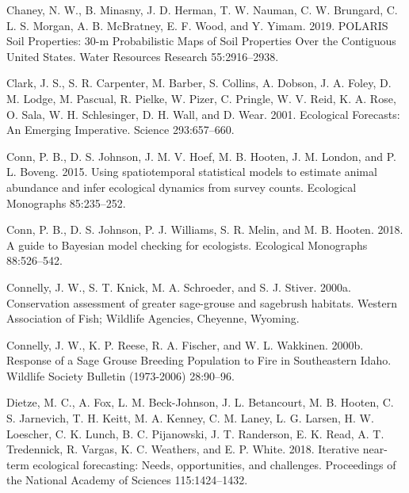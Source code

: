 \documentclass[
  12pt,
]{article}
\newlength{\cslhangindent}
\newenvironment{CSLReferences}[2] %
 {%
  \setlength{\parindent}{0pt}
  \ifodd #1 \everypar{\setlength{\hangindent}{\cslhangindent}}\ignorespaces\fi
  \ifnum #2 > 0
  \setlength{\parskip}{#2\baselineskip}
  \fi
 }%
 {}
\begin{document}
\begin{CSLReferences}{1}{0}
\leavevmode{}%
Chaney, N. W., B. Minasny, J. D. Herman, T. W. Nauman, C. W. Brungard, C. L. S. Morgan, A. B. McBratney, E. F. Wood, and Y. Yimam. 2019. {POLARIS} {Soil} {Properties}: 30-m {Probabilistic} {Maps} of {Soil} {Properties} {Over} the {Contiguous} {United} {States}. Water Resources Research 55:2916--2938.

\leavevmode{}%
Clark, J. S., S. R. Carpenter, M. Barber, S. Collins, A. Dobson, J. A. Foley, D. M. Lodge, M. Pascual, R. Pielke, W. Pizer, C. Pringle, W. V. Reid, K. A. Rose, O. Sala, W. H. Schlesinger, D. H. Wall, and D. Wear. 2001. Ecological {Forecasts}: {An} {Emerging} {Imperative}. Science 293:657--660.

\leavevmode{}%
Conn, P. B., D. S. Johnson, J. M. V. Hoef, M. B. Hooten, J. M. London, and P. L. Boveng. 2015. Using spatiotemporal statistical models to estimate animal abundance and infer ecological dynamics from survey counts. Ecological Monographs 85:235--252.

\leavevmode{}%
Conn, P. B., D. S. Johnson, P. J. Williams, S. R. Melin, and M. B. Hooten. 2018. A guide to {Bayesian} model checking for ecologists. Ecological Monographs 88:526--542.

\leavevmode{}%
Connelly, J. W., S. T. Knick, M. A. Schroeder, and S. J. Stiver. 2000a. Conservation assessment of greater sage-grouse and sagebrush habitats. Western Association of Fish; Wildlife Agencies, Cheyenne, Wyoming.

\leavevmode{}%
Connelly, J. W., K. P. Reese, R. A. Fischer, and W. L. Wakkinen. 2000b. Response of a {Sage} {Grouse} {Breeding} {Population} to {Fire} in {Southeastern} {Idaho}. Wildlife Society Bulletin (1973-2006) 28:90--96.

\leavevmode{}%
Dietze, M. C., A. Fox, L. M. Beck-Johnson, J. L. Betancourt, M. B. Hooten, C. S. Jarnevich, T. H. Keitt, M. A. Kenney, C. M. Laney, L. G. Larsen, H. W. Loescher, C. K. Lunch, B. C. Pijanowski, J. T. Randerson, E. K. Read, A. T. Tredennick, R. Vargas, K. C. Weathers, and E. P. White. 2018. Iterative near-term ecological forecasting: {Needs}, opportunities, and challenges. Proceedings of the National Academy of Sciences 115:1424--1432.


\end{CSLReferences}
\end{document}
